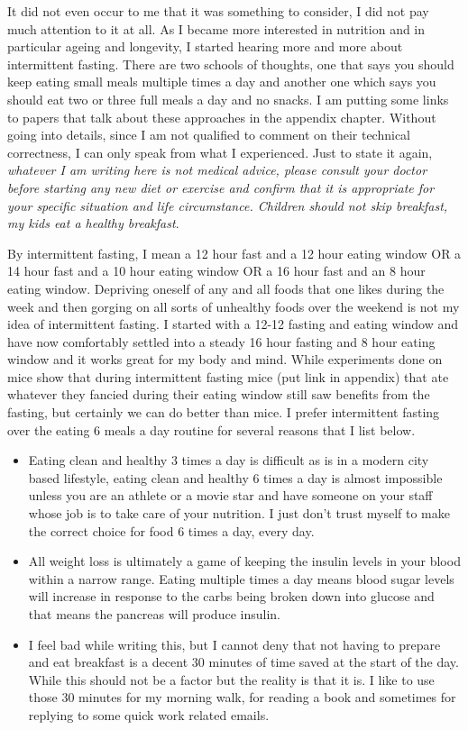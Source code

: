 \documentclass[
  oneside]{book}
\begin{document}
It did not even occur to me that it was something to consider, I did not pay much attention to it at all. As I became more interested in nutrition and in particular ageing and longevity, I started hearing more and more about intermittent fasting. There are two schools of thoughts, one that says you should keep eating small meals multiple times a day and another one which says you should eat two or three full meals a day and no snacks. I am putting some links to papers that talk about these approaches in the appendix chapter. Without going into details, since I am not qualified to comment on their technical correctness, I can only speak from what I experienced. Just to state it again, \emph{whatever I am writing here is not medical advice, please consult your doctor before starting any new diet or exercise and confirm that it is appropriate for your specific situation and life circumstance. Children should not skip breakfast, my kids eat a healthy breakfast}.

By intermittent fasting, I mean a 12 hour fast and a 12 hour eating window OR a 14 hour fast and a 10 hour eating window OR a 16 hour fast and an 8 hour eating window. Depriving oneself of any and all foods that one likes during the week and then gorging on all sorts of unhealthy foods over the weekend is not my idea of intermittent fasting. I started with a 12-12 fasting and eating window and have now comfortably settled into a steady 16 hour fasting and 8 hour eating window and it works great for my body and mind. While experiments done on mice show that during intermittent fasting mice (put link in appendix) that ate whatever they fancied during their eating window still saw benefits from the fasting, but certainly we can do better than mice. I prefer intermittent fasting over the eating 6 meals a day routine for several reasons that I list below.

\begin{itemize}
\item
  Eating clean and healthy 3 times a day is difficult as is in a modern city based lifestyle, eating clean and healthy 6 times a day is almost impossible unless you are an athlete or a movie star and have someone on your staff whose job is to take care of your nutrition. I just don't trust myself to make the correct choice for food 6 times a day, every day.
\item
  All weight loss is ultimately a game of keeping the insulin levels in your blood within a narrow range. Eating multiple times a day means blood sugar levels will increase in response to the carbs being broken down into glucose and that means the pancreas will produce insulin.
\item
  I feel bad while writing this, but I cannot deny that not having to prepare and eat breakfast is a decent 30 minutes of time saved at the start of the day. While this should not be a factor but the reality is that it is. I like to use those 30 minutes for my morning walk, for reading a book and sometimes for replying to some quick work related emails.
\end{itemize}
\end{document}
